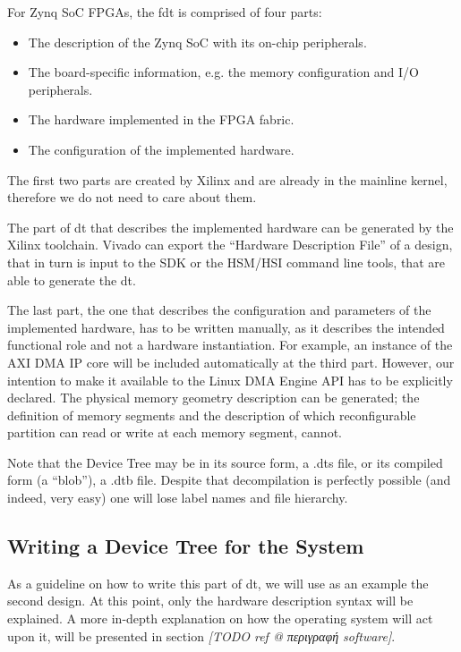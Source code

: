 For Zynq SoC FPGAs, the \gls{fdt} is comprised of four parts:

\begin{itemize}
\item	The description of the Zynq SoC with its on-chip peripherals.
\item	The board-specific information, e.g. the memory configuration and I/O peripherals.
\item	The hardware implemented in the FPGA \gls{fabric}.
\item	The configuration of the implemented hardware.
\end{itemize}

The first two parts are created by Xilinx and are already in the mainline kernel,
therefore we do not need to care about them.

The part of \gls{dt} that describes the implemented hardware can be generated by the
Xilinx toolchain. Vivado can export the ``Hardware Description File'' of a design,
that in turn is input to the SDK or the HSM/HSI command line tools, that are able
to generate the \gls{dt}.

The last part, the one that describes the configuration and parameters of the implemented hardware,
has to be written manually, as it describes the intended functional role and not a hardware instantiation.
For example, an instance of the AXI DMA IP core will be included automatically at the third part.
However, our intention to make it available to the Linux DMA Engine API has to be explicitly declared.
The physical memory geometry description can be generated;
the definition of memory segments and the description of which reconfigurable partition
can read or write at each memory segment, cannot.

Note that the Device Tree may be in its source form,
a .dts file, or its compiled form (a ``blob''), a .dtb file.
Despite that decompilation is perfectly possible (and indeed, very easy)
one will lose label names and file hierarchy.

\subsection{Writing a Device Tree for the System}
\label{sec:dt}

As a guideline on how to write this part of \gls{dt}, we will use as an example the second design.
At this point, only the hardware description syntax will be explained.
A more in-depth explanation on how the operating system will act upon it,
will be presented in section \emph{[TODO ref @ περιγραφή software]}.

